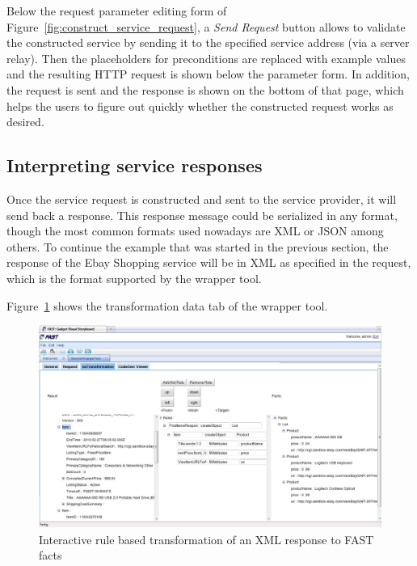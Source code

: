 \documentclass{fast_latex}
\begin{document}
Below the request parameter editing form of Figure~\ref{fig:construct_service_request}, a \textit{Send Request} button allows to validate the constructed service by sending it to the specified service address (via a server relay). Then the placeholders for preconditions are replaced with example values and the resulting HTTP request is shown below the parameter form. In addition, the request is sent and the response is shown on the bottom of that page, which helps the users to figure out quickly whether the constructed request works as desired. 


\subsection{Interpreting service responses} %
\label{sub:interpreting_service_responses}

Once the service request is constructed and sent to the service provider, it will send back a response. This response message could be serialized in any format, though the most common formats used nowadays are XML or JSON among others. To continue the example that was started in the previous section, the response of the Ebay Shopping service will be in XML as specified in the request, which is the format supported by the wrapper tool.

Figure~\ref{fig:response_service_execution} shows the transformation data tab of the wrapper tool. 

\begin{figure}
  \begin{center}
    \includegraphics[angle=90,width=0.8\linewidth]{images/ServiceWrapperToolGVSWithTransformationRules.jpg}
    \caption{Interactive rule based transformation of an XML response to FAST facts}
    \label{fig:response_service_execution}
  \end{center}
\end{figure}
\end{document}

